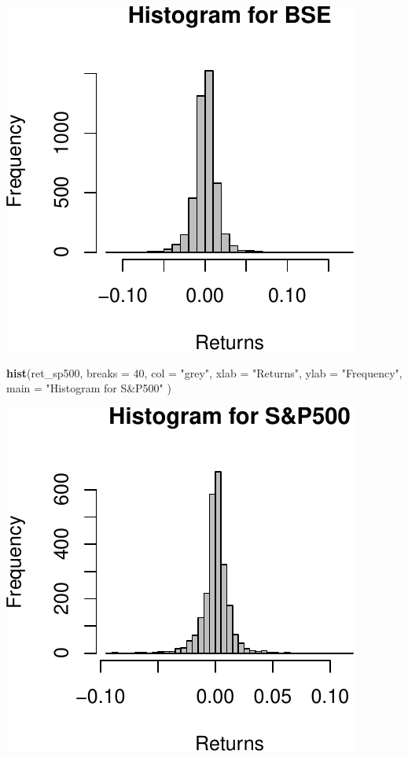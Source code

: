 \documentclass[11pt,]{article}
\newenvironment{Shaded}{\begin{snugshade}}{\end{snugshade}}
\newcommand{\KeywordTok}[1]{\textcolor[rgb]{0.13,0.29,0.53}{\textbf{#1}}}
\newcommand{\DataTypeTok}[1]{\textcolor[rgb]{0.13,0.29,0.53}{#1}}
\newcommand{\DecValTok}[1]{\textcolor[rgb]{0.00,0.00,0.81}{#1}}
\newcommand{\StringTok}[1]{\textcolor[rgb]{0.31,0.60,0.02}{#1}}
\newcommand{\NormalTok}[1]{#1}
\begin{document}
\begin{center}\includegraphics{FMC_T4_PhD_Fin_Time_Series_files/figure-latex/histograms-1} \end{center}

\begin{Shaded}
\begin{Highlighting}[]
\KeywordTok{hist}\NormalTok{(ret_sp500,}
     \DataTypeTok{breaks =} \DecValTok{40}\NormalTok{,}
     \DataTypeTok{col =} \StringTok{"grey"}\NormalTok{,}
     \DataTypeTok{xlab =} \StringTok{"Returns"}\NormalTok{,}
     \DataTypeTok{ylab =} \StringTok{"Frequency"}\NormalTok{,}
     \DataTypeTok{main =} \StringTok{"Histogram for S&P500"}
\NormalTok{     )}
\end{Highlighting}
\end{Shaded}

\begin{center}\includegraphics{FMC_T4_PhD_Fin_Time_Series_files/figure-latex/histograms-2} \end{center}
\end{document}
